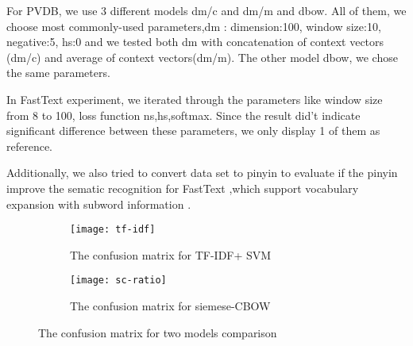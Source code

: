 For PVDB, we use 3 different models dm/c and dm/m and dbow. All of them, we choose most commonly-used parameters,dm : dimension:100, window size:10, negative:5, hs:0 and we tested both dm with concatenation of context vectors (dm/c) and average of context vectors(dm/m). The other model dbow, we chose the same parameters.

In FastText experiment, we iterated through the parameters like window size from 8 to 100, loss function ns,hs,softmax.  Since the result did't indicate significant difference between these parameters, we only display 1 of them as reference.

Additionally, we also tried to convert data set to pinyin to evaluate if the pinyin improve the sematic recognition for FastText ,which support vocabulary expansion with subword information \cite{bojanowski2016enriching}. 


\begin{figure}
\centering
\begin{subfigure}{.5\textwidth}
  \centering
  \texttt{[image: tf-idf]}
  \caption{The confusion matrix for TF-IDF+ SVM }
  \label{fig:sub1}
\end{subfigure}%
\begin{subfigure}{.5\textwidth}
  \centering
  \texttt{[image: sc-ratio]}
  \caption{The confusion matrix for siemese-CBOW}
  \label{fig:sub2}
\end{subfigure}
\caption{The confusion matrix for two models comparison}
\label{fig:confusion}
\end{figure}
